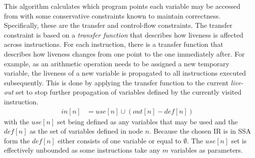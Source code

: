 \documentclass{article}
\begin{document}
This algorithm calculates which program points each variable may be accessed from with some conservative constraints known to maintain correctness. Specifically, these are the transfer and control-flow constraints. %
The transfer constraint is based on a \textit{transfer function} that describes how liveness is affected across instructions. For each instruction, there is a transfer function that describes how liveness changes from one point to the one immediately after. For example, as an arithmetic operation needs to be assigned a new temporary variable, the liveness of a new variable is propagated to all  instructions  executed subsequently. This is done by applying the transfer function to the current \textit{live-out} set to stop further propagation of variables defined by the currently visited instruction. %
\begin{align}\label{flowin}
  \mathit{in}\left[n\right] &= \mathit{use}\left[n\right] \cup (\mathit{out}\left[n\right] - \mathit{def}\left[n\right])
\end{align}
with the \(\mathit{use}[n]\) set being defined as any variables that may be used and the \(\mathit{def}[n]\) as the set of variables defined in node \(n\). Because the chosen IR is in SSA form the \(\mathit{def}[n]\) either consists of one variable or equal to \(\emptyset\). The  \(\mathit{use}[n]\) set is effectively unbounded as some instructions take any \(m\) variables as parameters.
\end{document}
